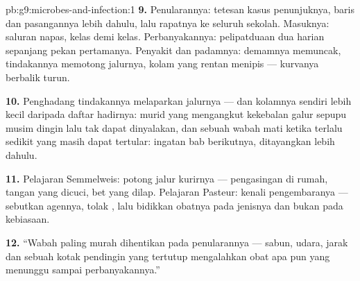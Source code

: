 \begin{solution}{pb:g9:microbes-and-infection:1}
\textbf{9.} Penularannya: tetesan kasus penunjuknya, baris
dan pasangannya lebih dahulu, lalu rapatnya ke seluruh
sekolah. Masuknya: saluran napas, kelas demi kelas.
Perbanyakannya: pelipatduaan dua harian sepanjang pekan
pertamanya. Penyakit dan padamnya: demamnya memuncak,
tindakannya memotong jalurnya, kolam yang rentan menipis ---
kurvanya berbalik turun.

\textbf{10.} Penghadang tindakannya melaparkan jalurnya ---
dan kolamnya sendiri lebih kecil daripada daftar hadirnya:
murid yang mengangkut kekebalan galur sepupu musim dingin
lalu tak dapat dinyalakan, dan sebuah wabah mati ketika
terlalu sedikit yang masih dapat tertular: ingatan bab
berikutnya, ditayangkan lebih dahulu.

\textbf{11.} Pelajaran Semmelweis: potong jalur kurirnya ---
pengasingan di rumah, tangan yang dicuci, bet yang dilap.
Pelajaran Pasteur: kenali pengembaranya --- sebutkan agennya,
tolak , lalu bidikkan obatnya pada jenisnya dan
bukan pada kebiasaan.

\textbf{12.} ``Wabah paling murah dihentikan pada
penularannya --- sabun, udara, jarak dan sebuah kotak
pendingin yang tertutup mengalahkan obat apa pun yang
menunggu sampai perbanyakannya.''
\end{solution}
